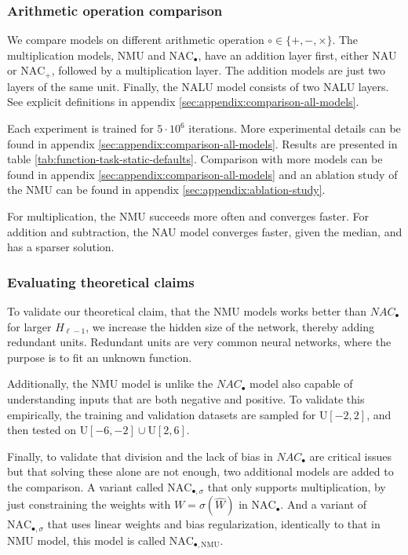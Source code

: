 \subsubsection{Arithmetic operation comparison}
We compare models on different arithmetic operation $\circ \in \{+, -, \times\}$. The multiplication models, NMU and $\mathrm{NAC}_{\bullet}$, have an addition layer first, either NAU or $\mathrm{NAC}_{+}$, followed by a multiplication layer. The addition models are just two layers of the same unit. Finally, the NALU model consists of two NALU layers. See explicit definitions in appendix \ref{sec:appendix:comparison-all-models}.

Each experiment is trained for $5 \cdot 10^6$ iterations. More experimental details can be found in appendix \ref{sec:appendix:comparison-all-models}. Results are presented in table \ref{tab:function-task-static-defaults}. Comparison with more models can be found in appendix \ref{sec:appendix:comparison-all-models} and an ablation study of the NMU can be found in appendix \ref{sec:appendix:ablation-study}.

For multiplication, the NMU succeeds more often and converges faster. For addition and subtraction, the NAU model converges faster, given the median, and has a sparser solution.



\subsubsection{Evaluating theoretical claims}

To validate our theoretical claim, that the NMU models works better than $NAC_{\bullet}$ for larger $H_{\ell-1}$, we increase the hidden size of the network, thereby adding redundant units. Redundant units are very common neural networks, where the purpose is to fit an unknown function.%

Additionally, the NMU model is unlike the $NAC_{\bullet}$ model also capable of understanding inputs that are both negative and positive. To validate this empirically, the training and validation datasets are sampled for $\mathrm{U}[-2,2]$, and then tested on $\mathrm{U}[-6,-2] \cup \mathrm{U}[2,6]$.

Finally, to validate that division and the lack of bias in $NAC_{\bullet}$ are critical issues but that solving these alone are not enough, two additional models are added to the comparison. A variant called $\mathrm{NAC}_{\bullet, \sigma}$ that only supports multiplication, by just constraining the weights with $W = \sigma(\hat{W})$ in $\mathrm{NAC}_{\bullet}$. And a variant of $\mathrm{NAC}_{\bullet, \sigma}$ that uses linear weights and bias regularization, identically to that in NMU model, this model is called $\mathrm{NAC}_{\bullet, \mathrm{NMU}}$.

